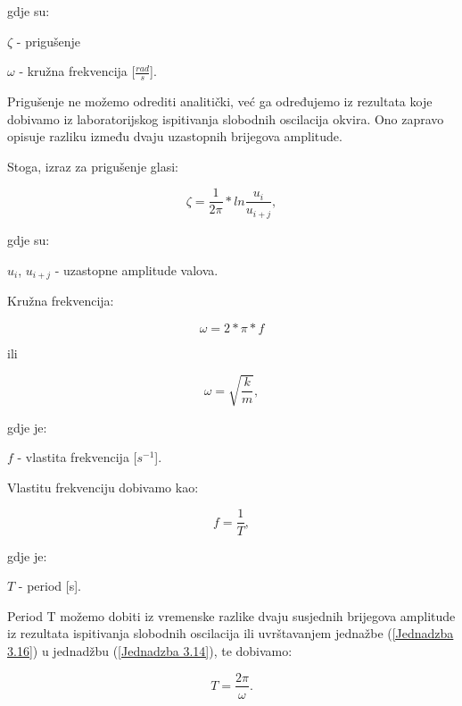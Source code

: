 \documentclass[12pt]{book}
\begin{document}
gdje su:

$\zeta$ - prigušenje

$\omega$ - kružna frekvencija [$\frac{rad}{s}$].

Prigušenje ne možemo odrediti analitički, već ga određujemo iz rezultata koje dobivamo iz laboratorijskog ispitivanja slobodnih oscilacija okvira. Ono zapravo opisuje razliku između dvaju uzastopnih brijegova amplitude.

Stoga, izraz za prigušenje glasi:

\begin{equation}\label{Jednadzba 3.13}
	\zeta = \frac{1}{2\pi} * ln\frac{u_i}{u_{i+j}},
\end{equation}

gdje su:

$u_i$, $u_{i+j}$ - uzastopne amplitude valova.

Kružna frekvencija:

\begin{equation}\label{Jednadzba 3.14}
	\omega = 2 * \pi * f
\end{equation}

\begin{center}
	ili
\end{center}

\begin{equation}\label{Jednadzba 3.15}
	\omega = \sqrt{\frac{k}{m}},
\end{equation}

gdje je:

$f$ - vlastita frekvencija [$s^{-1}$].

Vlastitu frekvenciju dobivamo kao:

\begin{equation}\label{Jednadzba 3.16}
	f = \frac{1}{T},
\end{equation}

gdje je:

$T$ - period [s].

Period T možemo dobiti iz vremenske razlike dvaju susjednih brijegova amplitude iz rezultata ispitivanja slobodnih oscilacija ili uvrštavanjem jednažbe (\ref{Jednadzba 3.16}) u jednadžbu (\ref{Jednadzba 3.14}), te dobivamo:

\begin{equation}\label{Jednadzba 3.17}
	T = \frac{2\pi}{\omega}.
\end{equation}

\cite{chopra2007} \cite{dinamika_ZG}
\end{document}
